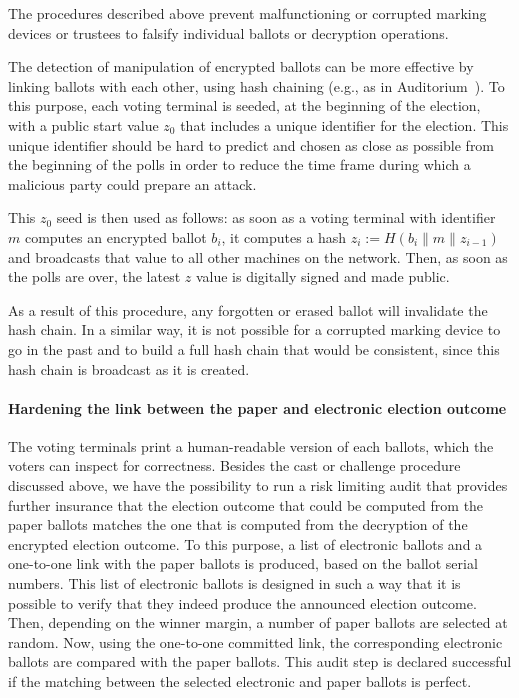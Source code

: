 The procedures described above prevent malfunctioning or corrupted
marking devices or trustees to falsify individual ballots or decryption
operations.

The detection of manipulation of encrypted ballots can be more
effective by linking ballots with each other, using hash
chaining (e.g., as in Auditorium~\cite{sandler07auditorium}).  To
this purpose, each voting terminal is seeded, at the beginning
of the election, with a public start value $z_0$ that includes a
unique identifier for the election. This unique identifier should be
hard to predict and chosen as close as possible from the beginning of
the polls in order to reduce the time frame during which a malicious
party could prepare an attack.

This $z_0$ seed is then used as follows: as soon as a voting terminal with identifier $m$ computes an encrypted ballot $b_i$, it
computes a hash $z_i := H(b_i \| m \| z_{i-1})$ and broadcasts that
value to all other machines on the network. Then, as soon as the polls
are over, the latest $z$ value is digitally signed and made public.

As a result of this procedure, any forgotten or erased ballot will
invalidate the hash chain. In a similar way, it is not possible for a
corrupted marking device to go in the past and to build a full hash
chain that would be consistent, since this hash chain is broadcast as
it is created.

\paragraph{Hardening the link between the paper and electronic
  election outcome}
\label{sec:hard-link-betw}

The voting terminals print a human-readable version of each
ballots, which the voters can inspect for correctness. Besides the
cast or challenge procedure discussed above, we have the possibility
to run a risk limiting audit that provides further insurance that the
election outcome that could be computed from the paper ballots matches
the one that is computed from the decryption of the encrypted election
outcome. To this purpose, a list of electronic ballots and a
one-to-one link with the paper ballots is produced, based on the
ballot serial numbers. This list of electronic ballots is designed in
such a way that it is possible to verify that they indeed produce the
announced election outcome. Then, depending on the winner margin, a
number of paper ballots are selected at random. Now, using the
one-to-one committed link, the corresponding electronic ballots are
compared with the paper ballots. This audit step is declared
successful if the matching between the selected electronic and paper
ballots is perfect.



